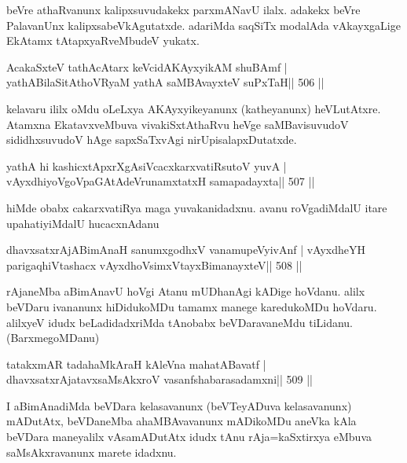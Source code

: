 \begin{artha}
beVre athaRvanunx kalipxsuvudakekx parxmANavU ilalx. adakekx beVre PalavanUnx kalipxsabeVkAgutatxde. adariMda saqSiTx modalAda vAkayxgaLige EkAtamx tAtapxyaRveMbudeV yukatx.
\end{artha}



\begin{shl}
AcakaSxteV tathAcAtarx keVcidAKAyxyikAM shuBAmf |
yathABilaSitAthoVR\s yaM yathA saMBAvayxteV suPxTaH\hfill || 506 ||
\end{shl}

\begin{artha}
kelavaru ililx oMdu oLeLxya AKAyxyikeyanunx (katheyanunx) heVLutAtxre. Atamxna EkatavxveMbuva vivakiSxtAthaRvu heVge saMBavisuvudoV sididhxsuvudoV hAge sapxSaTxvAgi nirUpisalapxDutatxde.
\end{artha}

\begin{shl}
yathA hi kashicxtApxrXgAsiVcacxkarxvatiRsutoV yuvA |
vAyxdhiyoVgoVpaGAtAdeVrunamxtatxH samapadayxta\hfill || 507 ||
\end{shl}

\begin{artha}
hiMde obabx cakarxvatiRya maga yuvakanidadxnu. avanu roVgadiMdalU
itare upahatiyiMdalU hucacxnAdanu
\end{artha}

\begin{shl}
dhavxsatxrAjABimAnaH sanumxgodhxV vanamupeVyivAnf |
vAyxdheYH parigaqhiVtashacx vAyxdhoV\s simxVtayxBimanayxteV\hfill || 508 ||
\end{shl}

\begin{artha}
rAjaneMba aBimAnavU hoVgi Atanu mUDhanAgi kADige hoVdanu. alilx
beVDaru ivananunx hiDidukoMDu tamamx manege karedukoMDu hoVdaru.
alilxyeV idudx beLadidadxriMda tAnobabx beVDaravaneMdu tiLidanu. (BarxmegoMDanu)
\end{artha}

\begin{shl}
tatakxmAR tadahaMkAraH kAleVna mahatA\s Bavatf |
dhavxsatxrAjatavxsaMsAkxroV vasanfshabarasadamxni\hfill || 509 ||
\end{shl}

\begin{artha}
I aBimAnadiMda beVDara kelasavanunx (beVTeyADuva kelasavanunx) mADutAtx, beVDaneMba ahaMBAvavanunx mADikoMDu aneVka kAla beVDara maneyalilx vAsamADutAtx idudx tAnu rAja=kaSxtirxya eMbuva saMsAkxravanunx marete idadxnu.
\end{artha}

